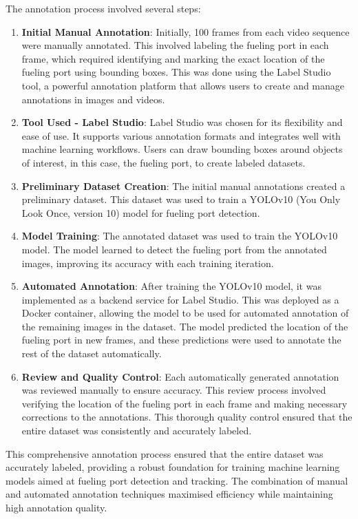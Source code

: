 \documentclass[12pt,oneside]{book} %
\begin{document}
The annotation process involved several steps:
\begin{enumerate}
    \item \textbf{Initial Manual Annotation}: Initially, 100 frames from each video sequence were manually annotated. This involved labeling the fueling port in each frame, which required identifying and marking the exact location of the fueling port using bounding boxes. This was done using the Label Studio tool, a powerful annotation platform that allows users to create and manage annotations in images and videos.
    \item \textbf{Tool Used - Label Studio}: Label Studio was chosen for its flexibility and ease of use. It supports various annotation formats and integrates well with machine learning workflows. Users can draw bounding boxes around objects of interest, in this case, the fueling port, to create labeled datasets.
    \item \textbf{Preliminary Dataset Creation}: The initial manual annotations created a preliminary dataset. This dataset was used to train a YOLOv10 (You Only Look Once, version 10) model for fueling port detection.
    \item \textbf{Model Training}: The annotated dataset was used to train the YOLOv10 model. The model learned to detect the fueling port from the annotated images, improving its accuracy with each training iteration.
    \item \textbf{Automated Annotation}: After training the YOLOv10 model, it was implemented as a backend service for Label Studio. This was deployed as a Docker container, allowing the model to be used for automated annotation of the remaining images in the dataset. The model predicted the location of the fueling port in new frames, and these predictions were used to annotate the rest of the dataset automatically.
    \item \textbf{Review and Quality Control}: Each automatically generated annotation was reviewed manually to ensure accuracy. This review process involved verifying the location of the fueling port in each frame and making necessary corrections to the annotations. This thorough quality control ensured that the entire dataset was consistently and accurately labeled.
\end{enumerate}

This comprehensive annotation process ensured that the entire dataset was
accurately labeled, providing a robust foundation for training machine learning
models aimed at fueling port detection and tracking. The combination of manual
and automated annotation techniques maximised efficiency while maintaining high
annotation quality.
\end{document}
